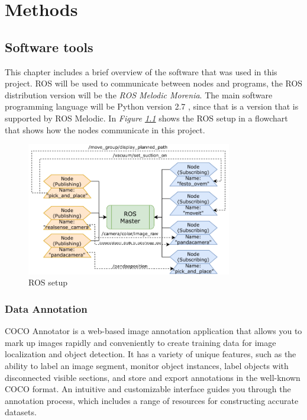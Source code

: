 \chapter{Methods}
\section{Software tools}

This chapter includes a brief overview of the software that was used in this project. 
ROS will be used to communicate between nodes and programs, the ROS distribution version will be the \textit{ROS Melodic Morenia}\cite{marguedas_ros_2018}. 
The main software programming language will be Python version 2.7 \cite{noauthor_python_nodate}, since that is a version that is supported by ROS Melodic.
In \textit{Figure \ref{fig:roswork}} shows the ROS setup in a flowchart that shows how the nodes communicate in this project.
\begin{figure}[h]
 \centering
 \includegraphics[width=0.8\textwidth]{graphics/ros.pdf}
 \caption{ROS setup}
 \label{fig:roswork}
\end{figure}


\subsection{Data Annotation}
COCO Annotator is a web-based image annotation application that allows you to mark up images rapidly and conveniently to create training data for image localization and object detection\cite{brooks_jsbrokscoco-annotator_2021}. It has a variety of unique features, such as the ability to label an image segment, monitor object instances, label objects with disconnected visible sections, and store and export annotations in the well-known COCO format. An intuitive and customizable interface guides you through the annotation process, which includes a range of resources for constructing accurate datasets.

